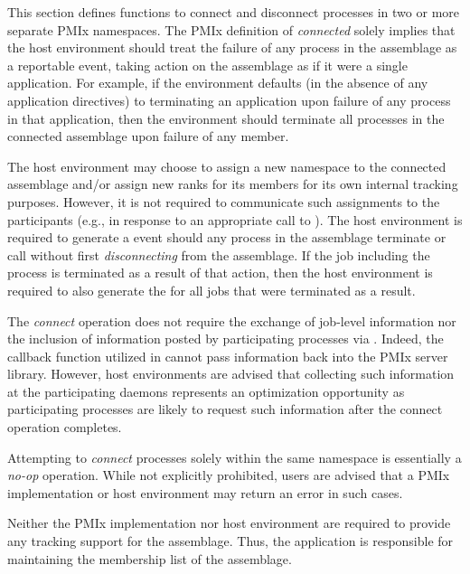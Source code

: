This section defines functions to connect and disconnect processes in two or more separate \ac{PMIx} namespaces. The \ac{PMIx} definition of \textit{connected} solely implies that the host environment should treat the failure of any process in the assemblage as a reportable event, taking action on the assemblage as if it were a single application. For example, if the environment defaults (in the absence of any application directives) to terminating an application upon failure of any process in that application, then the environment should terminate all processes in the connected assemblage upon failure of any member.

The host environment may choose to assign a new namespace to the connected assemblage and/or assign new ranks for its members for its own internal tracking purposes. However, it is not required to communicate such assignments to the participants (e.g., in response to an appropriate call to ). The host environment is required to generate a  event should any process in the assemblage terminate or call  without first \textit{disconnecting} from the assemblage. If the job including the process is terminated as a result of that action, then the host environment is required to also generate the  for all jobs that were terminated as a result.

\advicermstart
The \textit{connect} operation does not require the exchange of job-level information nor the inclusion of information posted by  participating processes via . Indeed, the callback function utilized in  cannot pass information back into the \ac{PMIx} server library. However, host environments are advised that collecting such information at the participating daemons represents an optimization opportunity as participating processes are likely to request such information after the connect operation completes.
\advicermend

\adviceuserstart
Attempting to \textit{connect} processes solely within the same namespace is essentially a \textit{no-op} operation. While not explicitly prohibited, users are advised that a \ac{PMIx} implementation or host environment may return an error in such cases.

Neither the \ac{PMIx} implementation nor host environment are required to provide any tracking support for the assemblage. Thus, the application is responsible for maintaining the membership list of the assemblage.
\adviceuserend


